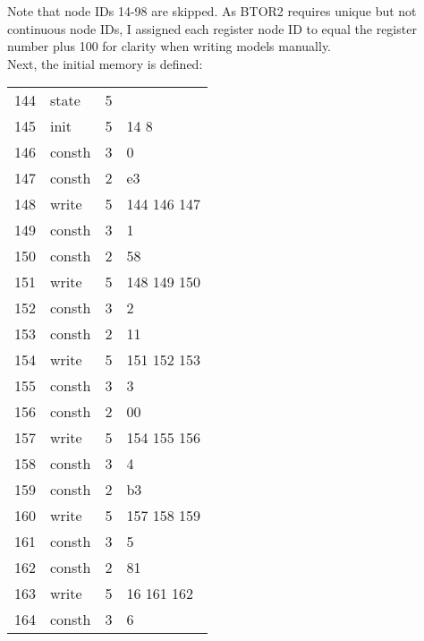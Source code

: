 Note that node IDs 14-98 are skipped. As BTOR2 requires unique but
not continuous node IDs, I assigned each register node ID to equal
the register number plus 100 for clarity when writing models
manually.\\ Next, the initial memory is defined:
\begin{center}
        \begin{tabular}[h!]{>{\ttfamily\color{UniRed}}r >{\ttfamily}l >{\ttfamily\color{UniGrey}}l >{\ttfamily\color{UniBlue}}l}
                144 & state  & 5 &                           \\
                145 & init   & 5 & \color{UniRed} 14 8       \\
                146 & consth & 3 & 0                         \\
                147 & consth & 2 & e3                        \\
                148 & write  & 5 & \color{UniRed}144 146 147 \\
                149 & consth & 3 & 1                         \\
                150 & consth & 2 & 58                        \\
                151 & write  & 5 & \color{UniRed}148 149 150 \\
                152 & consth & 3 & 2                         \\
                153 & consth & 2 & 11                        \\
                154 & write  & 5 & \color{UniRed}151 152 153 \\
                155 & consth & 3 & 3                         \\
                156 & consth & 2 & 00                        \\
                157 & write  & 5 & \color{UniRed}154 155 156 \\
                158 & consth & 3 & 4                         \\
                159 & consth & 2 & b3                        \\
                160 & write  & 5 & \color{UniRed}157 158 159 \\
                161 & consth & 3 & 5                         \\
                162 & consth & 2 & 81                        \\
                163 & write  & 5 & \color{UniRed} 16 161 162 \\
                164 & consth & 3 & 6                         \\

\end{tabular}
\end{center}
